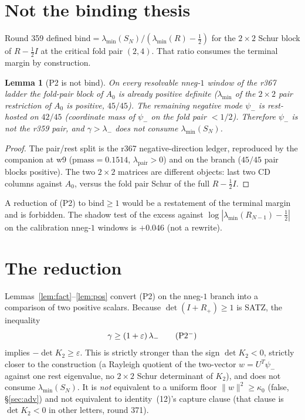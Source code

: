 \documentclass[11pt]{article}
\newtheorem{lemma}{Lemma}
\theoremstyle{remark}
\newcommand{\half}{\tfrac12}
\newcommand{\lam}{\lambda_{-}}
\newcommand{\psim}{\psi_{-}}
\newcommand{\Rp}{R_{+}}
\begin{document}
\section{Not the binding thesis}\label{sec:bind}

Round 359 defined
$\mathrm{bind}=\lambda_{\min}(S_{N})/(\lambda_{\min}(R)-\half)$
for the $2\times2$ Schur block of $R-\half I$ at the critical
fold pair $(2,4)$.  That ratio consumes the terminal margin by
construction.

\begin{lemma}[P2 is not bind]\label{lem:notbind}
On every resolvable nneg-$1$ window of the r367 ladder the
fold-pair block of $A_{0}$ is already positive definite
($\lambda_{\min}$ of the $2\times2$ pair restriction of $A_{0}$
is positive, $45/45$).  The remaining negative mode $\psim$ is
rest-hosted on $42/45$ (coordinate mass of $\psim$ on the fold
pair $<1/2$).  Therefore $\psim$ is not the r359 pair, and
$\gamma>\lam$ does not consume $\lambda_{\min}(S_{N})$.
\end{lemma}

\begin{proof}
The pair/rest split is the r367 negative-direction ledger,
reproduced by the companion at w9 ($\mathrm{pmass}=0.1514$,
$\lambda_{\mathrm{pair}}>0$) and on the branch ($45/45$ pair
blocks positive).  The two $2\times2$ matrices are different
objects: last two CD columns against $A_{0}$, versus the fold
pair Schur of the full $R-\half I$.
\end{proof}

A reduction of (P2) to $\mathrm{bind}\ge 1$ would be a restatement
of the terminal margin and is forbidden.  The shadow test of the
excess against $\log|\lambda_{\min}(R_{N-1})-\half|$ on the
calibration nneg-$1$ windows is $+0.046$ (not a rewrite).

\section{The reduction}\label{sec:reduction}

Lemmas~\ref{lem:fact}--\ref{lem:pos} convert (P2) on the nneg-$1$
branch into a comparison of two positive scalars.  Because
$\det(I+\Rp)\ge 1$ is SATZ, the inequality
\begin{equation}\label{eq:red}
\gamma\ge(1+\varepsilon)\,\lam
\tag{P2$^{-}$}
\end{equation}
implies $-\det K_{2}\ge\varepsilon$.  This is strictly stronger
than the sign $\det K_{2}<0$, strictly closer to the construction
(a Rayleigh quotient of the two-vector $w=U^{T}\psim$ against one
rest eigenvalue, no $2\times2$ Schur determinant of $K_{2}$), and
does not consume $\lambda_{\min}(S_{N})$.  It is \emph{not}
equivalent to a uniform floor $\|w\|^{2}\ge\kappa_{0}$ (false,
\S\ref{sec:adv}) and not equivalent to identity~(12)'s capture
clause (that clause is $\det K_{2}<0$ in other letters, round 371).
\end{document}
